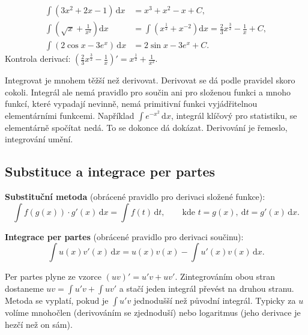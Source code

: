 \begin{example}
  \begin{align*}
    \int(3x^2 + 2x - 1)\,\mathrm{d}x &= x^3 + x^2 - x + C,\\
    \int\left(\sqrt{x} + \frac{1}{x^2}\right)\mathrm{d}x &= \int\left(x^{\frac{1}{2}} + x^{-2}\right)\mathrm{d}x = \frac{2}{3}x^{\frac{3}{2}} - \frac{1}{x} + C,\\
    \int(2\cos x - 3e^x)\,\mathrm{d}x &= 2\sin x - 3e^x + C.
  \end{align*}
  Kontrola derivací: ${\left(\frac{2}{3}x^{\frac{3}{2}} - \frac{1}{x}\right)}' = x^{\frac{1}{2}} + \frac{1}{x^2}$.
\end{example}

\begin{note}
  Integrovat je mnohem těžší než derivovat. Derivovat se dá podle pravidel skoro cokoli. Integrál ale nemá pravidlo pro součin ani pro složenou funkci a mnoho funkcí, které vypadají nevinně, nemá primitivní funkci vyjádřitelnou elementárními funkcemi. Například $\int e^{-x^2}\,\mathrm{d}x$, integrál klíčový pro statistiku, se elementárně spočítat nedá. To se dokonce dá dokázat. Derivování je řemeslo, integrování umění.
\end{note}

\subsection{Substituce a integrace per partes}\label{sec:substituce-per-partes}

\begin{definitionbox}
  \textbf{Substituční metoda} (obrácené pravidlo pro derivaci složené funkce):
  \begin{equation*}
    \int f(g(x))\cdot g'(x)\,\mathrm{d}x = \int f(t)\,\mathrm{d}t,\qquad\text{kde } t = g(x),\ \mathrm{d}t = g'(x)\,\mathrm{d}x.
  \end{equation*}

  \textbf{Integrace per partes} (obrácené pravidlo pro derivaci součinu):
  \begin{equation*}
    \int u(x)v'(x)\,\mathrm{d}x = u(x)v(x) - \int u'(x)v(x)\,\mathrm{d}x.
  \end{equation*}
\end{definitionbox}

Per partes plyne ze vzorce $(uv)' = u'v + uv'$. Zintegrováním obou stran dostaneme $uv = \int u'v + \int uv'$ a stačí jeden integrál převést na druhou stranu. Metoda se vyplatí, pokud je $\int u'v$ jednodušší než původní integrál. Typicky za $u$ volíme mnohočlen (derivováním se zjednoduší) nebo logaritmus (jeho derivace je hezčí než on sám).

